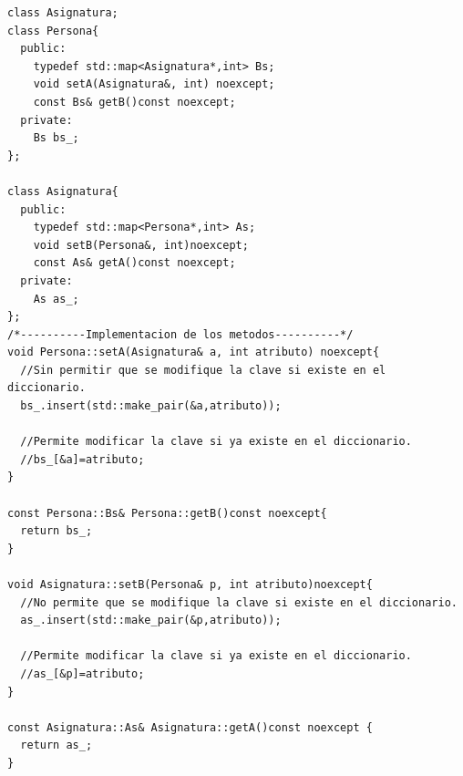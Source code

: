\begin{center}
	\begin{lstlisting}[frame=single]
class Asignatura;
class Persona{
  public:
    typedef std::map<Asignatura*,int> Bs;
    void setA(Asignatura&, int) noexcept;
    const Bs& getB()const noexcept;
  private:
    Bs bs_;
};

class Asignatura{
  public:
    typedef std::map<Persona*,int> As;
    void setB(Persona&, int)noexcept;
    const As& getA()const noexcept;
  private:
    As as_;
};
/*----------Implementacion de los metodos----------*/
void Persona::setA(Asignatura& a, int atributo) noexcept{
  //Sin permitir que se modifique la clave si existe en el diccionario.
  bs_.insert(std::make_pair(&a,atributo));

  //Permite modificar la clave si ya existe en el diccionario.
  //bs_[&a]=atributo;
}

const Persona::Bs& Persona::getB()const noexcept{
  return bs_; 
}

void Asignatura::setB(Persona& p, int atributo)noexcept{
  //No permite que se modifique la clave si existe en el diccionario.
  as_.insert(std::make_pair(&p,atributo));

  //Permite modificar la clave si ya existe en el diccionario.
  //as_[&p]=atributo;
}

const Asignatura::As& Asignatura::getA()const noexcept {
  return as_;
}
\end{lstlisting}
\end{center}